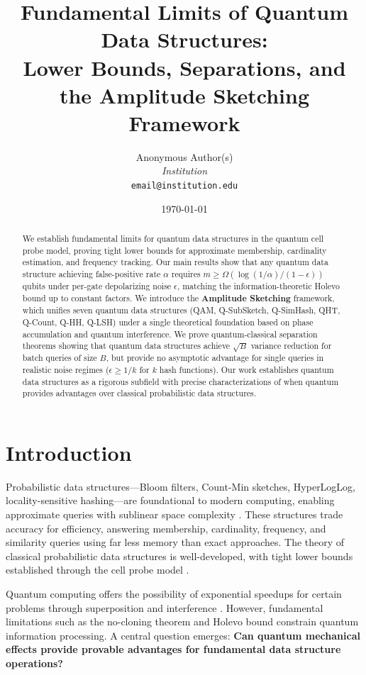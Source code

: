 \documentclass[11pt,letterpaper]{article}
\title{\textbf{Fundamental Limits of Quantum Data Structures:\\ Lower Bounds, Separations, and the Amplitude Sketching Framework}}
\author{
Anonymous Author(s)\\
\textit{Institution}\\
\texttt{email@institution.edu}
}
\date{\today}
\begin{document}
\maketitle

\begin{abstract}
We establish fundamental limits for quantum data structures in the quantum cell probe model, proving tight lower bounds for approximate membership, cardinality estimation, and frequency tracking. Our main results show that any quantum data structure achieving false-positive rate $\alpha$ requires $m \geq \Omega(\log(1/\alpha)/(1-\epsilon))$ qubits under per-gate depolarizing noise $\epsilon$, matching the information-theoretic Holevo bound up to constant factors. We introduce the \textbf{Amplitude Sketching} framework, which unifies seven quantum data structures (QAM, Q-SubSketch, Q-SimHash, QHT, Q-Count, Q-HH, Q-LSH) under a single theoretical foundation based on phase accumulation and quantum interference. We prove quantum-classical separation theorems showing that quantum data structures achieve $\sqrt{B}$ variance reduction for batch queries of size $B$, but provide no asymptotic advantage for single queries in realistic noise regimes ($\epsilon \geq 1/k$ for $k$ hash functions). Our work establishes quantum data structures as a rigorous subfield with precise characterizations of when quantum provides advantages over classical probabilistic data structures.
\end{abstract}

\section{Introduction}

Probabilistic data structures---Bloom filters, Count-Min sketches, HyperLogLog, locality-sensitive hashing---are foundational to modern computing, enabling approximate queries with sublinear space complexity \cite{bloom1970space,flajolet2007hyperloglog,indyk1998approximate}. These structures trade accuracy for efficiency, answering membership, cardinality, frequency, and similarity queries using far less memory than exact approaches. The theory of classical probabilistic data structures is well-developed, with tight lower bounds established through the cell probe model \cite{yao1981should,miltersen1999cell,patrascu2008lower}.

Quantum computing offers the possibility of exponential speedups for certain problems through superposition and interference \cite{grover1996fast,shor1997polynomial}. However, fundamental limitations such as the no-cloning theorem \cite{wootters1982single} and Holevo bound \cite{holevo1973bounds} constrain quantum information processing. A central question emerges: \textbf{Can quantum mechanical effects provide provable advantages for fundamental data structure operations?}
\end{document}
